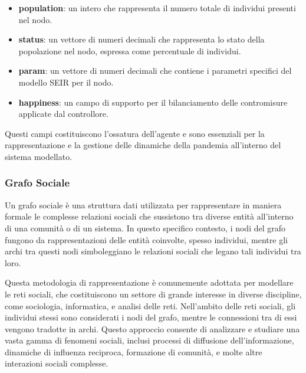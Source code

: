 \begin{itemize}
	\item \textbf{population}: un intero che rappresenta il numero totale 
	di individui presenti nel nodo.
	\item \textbf{status}: un vettore di numeri decimali che 
	rappresenta lo stato della popolazione nel nodo, espressa 
	come percentuale di individui.
	\item \textbf{param}: un vettore di numeri decimali che contiene 
	i parametri specifici del modello SEIR per il nodo.
	\item \textbf{happiness}: un campo di supporto per il bilanciamento 
	delle contromisure applicate dal controllore.
\end{itemize}

Questi campi costituiscono l'ossatura dell'agente e sono essenziali per 
la rappresentazione e la gestione delle dinamiche della pandemia 
all'interno del sistema modellato.

\subsubsection*{Grafo Sociale}

Un grafo sociale è una struttura dati utilizzata per rappresentare in 
maniera formale le complesse relazioni sociali che sussistono tra diverse 
entità all'interno di una comunità o di un sistema. In questo specifico 
contesto, i nodi del grafo fungono da rappresentazioni delle entità 
coinvolte, spesso individui, mentre gli archi tra questi nodi 
simboleggiano le relazioni sociali che legano tali individui tra loro.

Questa metodologia di rappresentazione è comunemente adottata per 
modellare le reti sociali, che costituiscono un settore di grande 
interesse in diverse discipline, come sociologia, informatica, e analisi 
delle reti. Nell'ambito delle reti sociali, gli individui stessi sono 
considerati i nodi del grafo, mentre le connessioni tra di essi vengono 
tradotte in archi. Questo approccio consente di analizzare e studiare 
una vasta gamma di fenomeni sociali, inclusi processi di diffusione 
dell'informazione, dinamiche di influenza reciproca, 
formazione di comunità, e molte altre interazioni sociali complesse.

